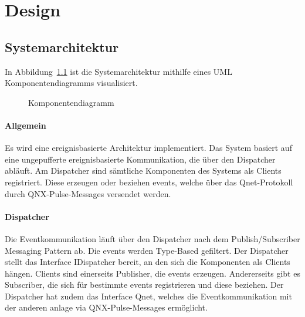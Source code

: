 \chapter{Design}\label{ch:design}



\section{Systemarchitektur}\label{sec:systemarchitektur}


In Abbildung~\ref{fig:cmp} ist die Systemarchitektur mithilfe eines UML Komponentendiagramms
visualisiert.

\begin{figure}[h]
    \centering
    \caption{Komponentendiagramm}
    \label{fig:cmp}
\end{figure}

\subsubsection{Allgemein}
Es wird eine ereignisbasierte Architektur implementiert.
Das System basiert auf eine ungepufferte ereignisbasierte Kommunikation,
die über den Dispatcher abläuft.
Am Dispatcher sind sämtliche Komponenten des Systems als Clients registriert.
Diese erzeugen oder beziehen \glspl{event}, welche über das Qnet-Protokoll durch QNX-Pulse-Messages versendet werden.

\subsubsection{Dispatcher}
Die Eventkommunikation läuft über den Dispatcher nach dem Publish/Subscriber Messaging Pattern ab.
Die \glspl{event} werden Type-Based gefiltert.
Der Dispatcher stellt das Interface IDispatcher bereit, an den sich die Komponenten als Clients hängen.
Clients sind einerseits Publisher, die \glspl{event} erzeugen.
Andererseits gibt es Subscriber, die sich für bestimmte \glspl{event} registrieren und diese beziehen.
Der Dispatcher hat zudem das Interface Qnet, welches die Eventkommunikation mit der anderen \gls{anlage} via QNX-Pulse-Messages ermöglicht.

